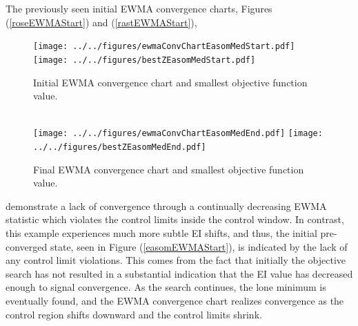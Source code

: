 \documentclass[12pt]{article}
\begin{document}
	The previously seen initial EWMA convergence charts, Figures (\ref{roseEWMAStart}) and (\ref{rastEWMAStart}),
	\begin{figure}
	\texttt{[image: ../../figures/ewmaConvChartEasomMedStart.pdf]}
	\texttt{[image: ../../figures/bestZEasomMedStart.pdf]}
	\caption{Initial EWMA convergence chart and smallest objective function value. }
	\label{easomEWMAStart}
	$~$\\
	\texttt{[image: ../../figures/ewmaConvChartEasomMedEnd.pdf]}
	\texttt{[image: ../../figures/bestZEasomMedEnd.pdf]}
	\caption{Final EWMA convergence chart and smallest objective function value. }
	\label{easomEWMAEnd}
	\end{figure}
	demonstrate a
	lack of convergence through a continually decreasing EWMA statistic which violates the control limits inside the control window.
	In contrast, this example experiences much more subtle EI shifts, and thus, the initial pre-converged state, seen in Figure (\ref{easomEWMAStart}), is indicated by the lack of any control limit violations.
	This comes from the fact that initially the objective search has not resulted in a substantial indication that the EI value has decreased enough to signal convergence.
	As the search continues, the lone minimum is eventually found, and the EWMA convergence chart realizes convergence as the control region shifts downward and the control limits shrink. 
	
	
	
\end{document}
